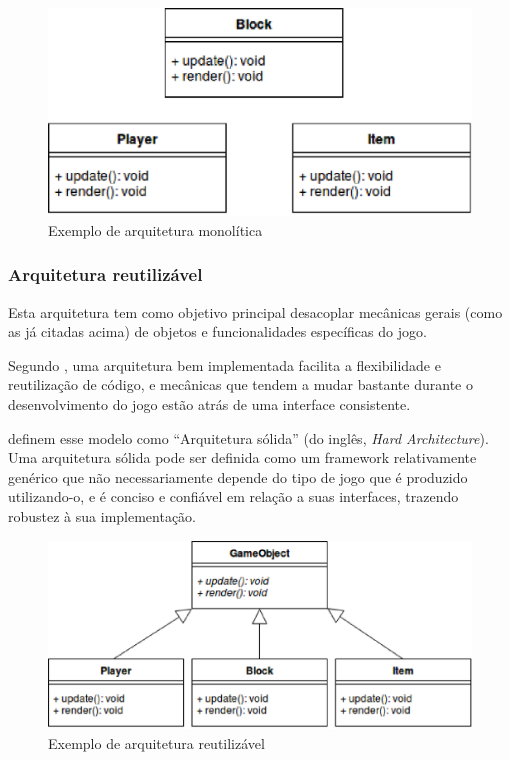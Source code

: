 \begin{figure}[H]
 \centering \includegraphics[keepaspectratio=true,scale=0.6]{figuras/monolithic-architecture.eps}
   \caption{Exemplo de arquitetura monolítica}
   \label{arch-monolitica}
\end{figure}

\subsubsection{Arquitetura reutilizável}

Esta arquitetura tem como objetivo principal desacoplar mecânicas gerais (como as já citadas acima) de objetos e funcionalidades específicas do jogo.

Segundo , uma arquitetura bem implementada facilita a flexibilidade e reutilização de código, e mecânicas que tendem a mudar bastante durante o desenvolvimento do jogo estão atrás de uma interface consistente.

 definem esse modelo como “Arquitetura sólida” (do inglês, \textit{Hard Architecture}). Uma arquitetura sólida pode ser definida como um framework relativamente genérico que não necessariamente depende do tipo de jogo que é produzido utilizando-o, e é conciso e confiável em relação a suas interfaces, trazendo robustez à sua implementação.

\begin{figure}[H]
 \centering \includegraphics[keepaspectratio=true,scale=0.6]{figuras/reusable-architecture.eps}
   \caption{Exemplo de arquitetura reutilizável}
   \label{arch-reutilizavel}
\end{figure}


